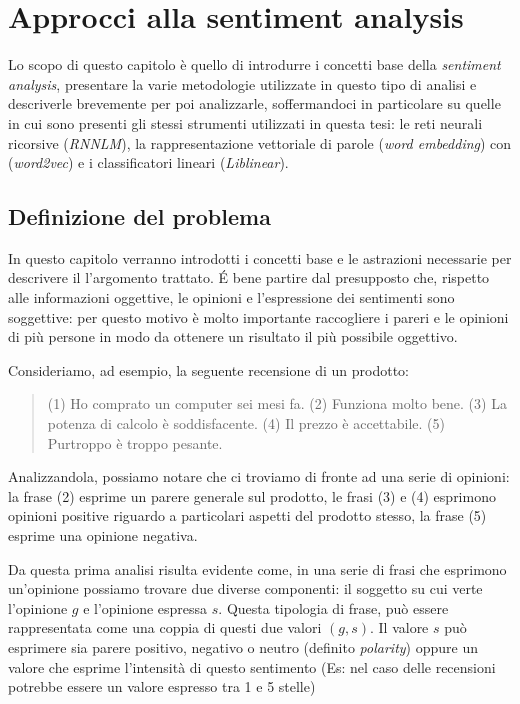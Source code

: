 \documentclass[a4paper,12pt,openright,twoside]{report}
\theoremstyle{definition}
\begin{document}
\chapter{Approcci alla sentiment analysis}

Lo scopo di questo capitolo è quello di introdurre i concetti base della \emph{sentiment analysis}, 
presentare la varie metodologie utilizzate in questo tipo di analisi e descriverle brevemente per poi 
analizzarle, soffermandoci in particolare su quelle in cui sono presenti gli stessi strumenti 
utilizzati in questa tesi: le reti neurali ricorsive (\emph{RNNLM}), 
la rappresentazione vettoriale di parole (\emph{word embedding})
con (\emph{word2vec}) e 
i classificatori lineari (\emph{Liblinear}).

\section{Definizione del problema}
In questo capitolo verranno introdotti i concetti base e le astrazioni necessarie
per descrivere il l'argomento trattato.
\'E bene partire dal presupposto che, rispetto alle informazioni oggettive, 
le opinioni e l'espressione dei sentimenti sono
soggettive: per questo motivo è molto importante raccogliere i pareri e le opinioni di più persone
in modo da ottenere un risultato il più possibile oggettivo.

Consideriamo, ad esempio, la seguente recensione di un prodotto:
\begin{quote}
(1) Ho comprato un computer sei mesi fa. (2) Funziona molto bene. (3) La potenza
di calcolo è soddisfacente. (4) Il prezzo è accettabile. (5) Purtroppo è troppo pesante.
\end{quote}
Analizzandola, possiamo notare che ci troviamo di fronte ad una serie di opinioni: la frase (2) esprime un 
parere generale sul prodotto, le frasi (3) e (4) esprimono opinioni positive riguardo
a particolari aspetti del prodotto stesso, la frase (5) esprime una opinione negativa.

Da questa prima analisi risulta evidente come, in una serie di frasi che esprimono un'opinione 
possiamo trovare due diverse componenti:
il soggetto su cui verte l'opinione $g$ e l'opinione espressa $s$.
Questa tipologia di frase, può essere rappresentata come una coppia di questi due valori $(g,s)$.
Il valore $s$ può esprimere sia parere positivo, negativo o neutro (definito \emph{polarity}) oppure un valore che 
esprime l'intensità di questo sentimento (Es: nel caso delle recensioni potrebbe
essere un valore espresso tra 1 e 5 stelle)
\end{document}
